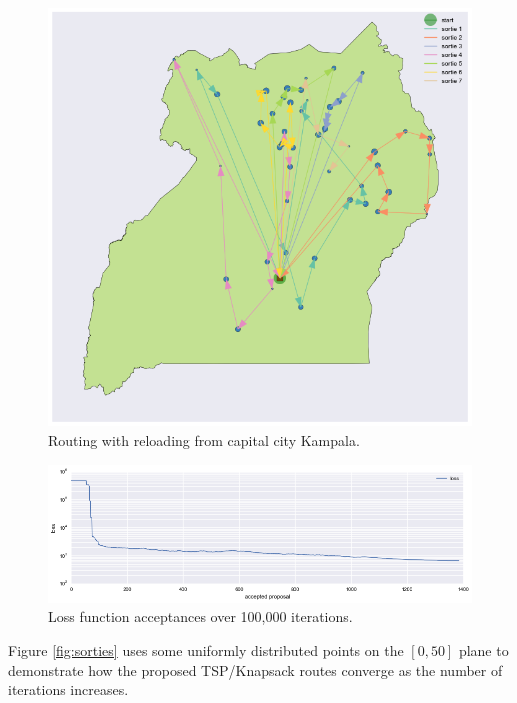 \documentclass{article} %
\begin{document}
\begin{figure}[h]
  \centering
  \includegraphics[width=\textwidth]{figures/routing-reloading}
  \caption{Routing with reloading from capital city Kampala.}
  \label{fig:routing-reloading}
\end{figure}

\begin{figure}[h]
  \centering
  \includegraphics[width=\textwidth]{figures/sorties-loss}
  \caption{Loss function acceptances over 100,000 iterations.}
  \label{fig:sorties-loss}
\end{figure}

Figure \ref{fig:sorties} uses some uniformly distributed points on the $[0,50]$ plane to demonstrate how the proposed TSP/Knapsack routes converge as the number of iterations increases.
\end{document}
